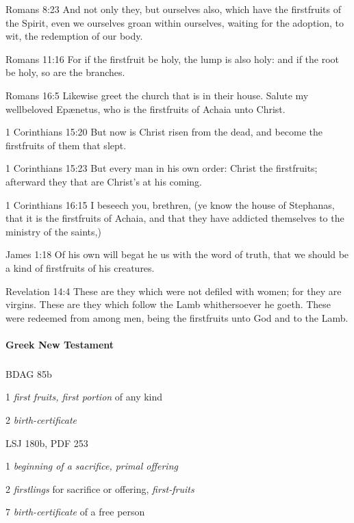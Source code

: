 			\begin{compactdesc}
				\item[Romans 8:23] And not only they, but ourselves also, which have the firstfruits of the Spirit, even we ourselves groan within ourselves, waiting for the adoption, to wit, the redemption of our body.
				\item[Romans 11:16] For if the firstfruit be holy, the lump is also holy: and if the root be holy, so are the branches.
				\item[Romans 16:5] Likewise greet the church that is in their house. Salute my wellbeloved Epænetus, who is the firstfruits of Achaia unto Christ.
				\item[1 Corinthians 15:20] But now is Christ risen from the dead, and become the firstfruits of them that slept.
				\item[1 Corinthians 15:23] But every man in his own order: Christ the firstfruits; afterward they that are Christ's at his coming.
				\item[1 Corinthians 16:15] I beseech you, brethren, (ye know the house of Stephanas, that it is the firstfruits of Achaia, and that they have addicted themselves to the ministry of the saints,)
				\item[James 1:18] Of his own will begat he us with the word of truth, that we should be a kind of firstfruits of his creatures.
				\item[Revelation 14:4] These are they which were not defiled with women; for they are virgins. These are they which follow the Lamb whithersoever he goeth. These were redeemed from among men, being the firstfruits unto God and to the Lamb.
			\end{compactdesc}
			
		\paragraph{Greek New Testament}
			\label{FIRSTFRUITS-GREEK}
		
			\subparagraph{\texorpdfstring{}{}}
				\label{APARCHE}
			
				\begin{compactdesc}
					\item[BDAG 85b] \textbf{}
						\begin{compactitem}
							\item[1] \textit{first fruits, first portion} of any kind
							\item[2] \textit{birth-certificate}
						\end{compactitem}
					\item[LSJ 180b, PDF 253] \textbf{}
						\begin{compactitem}
							\item[1] \textit{beginning of a sacrifice, primal offering}
							\item[2] \textit{firstlings} for sacrifice or offering, \textit{first-fruits}
							\item[7] \textit{birth-certificate} of a free person
						\end{compactitem}
				\end{compactdesc}
				
